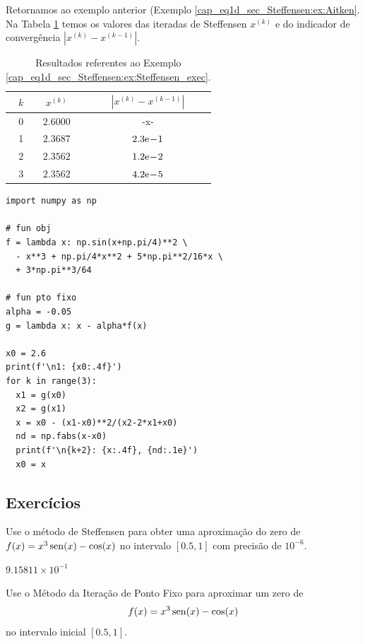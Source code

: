 \begin{ex}\label{cap_eq1d_sec_Steffensen:ex:Steffensen_exec}
  Retornamos ao exemplo anterior (Exemplo \ref{cap_eq1d_sec_Steffensen:ex:Aitken}. Na Tabela \ref{cap_eq1d_sec_Steffensen:tab:ex_Steffensen_exec} temos os valores das iteradas de Steffensen $x^{(k)}$ e do indicador de convergência $|x^{(k)}-x^{(k-1)}|$.

\begin{table}[h!]
  \centering
  \caption{Resultados referentes ao Exemplo \ref{cap_eq1d_sec_Steffensen:ex:Steffensen_exec}.}
  \label{cap_eq1d_sec_Steffensen:tab:ex_Steffensen_exec}
  \begin{tabular}{r|cc}
    $k$ & $x^{(k)}$ & $|x^{(k)}-x^{(k-1)}|$ \\\hline
    0 & $2.6000$ & -x- \\
    1 & $2.3687$ & $2.3\mathrm{e}\!-\!1$ \\
    2 & $2.3562$ & $1.2\mathrm{e}\!-\!2$ \\
    3 & $2.3562$ & $4.2\mathrm{e}\!-\!5$ \\\hline
  \end{tabular}
\end{table}

\begin{lstlisting}
import numpy as np

# fun obj
f = lambda x: np.sin(x+np.pi/4)**2 \
  - x**3 + np.pi/4*x**2 + 5*np.pi**2/16*x \
  + 3*np.pi**3/64

# fun pto fixo
alpha = -0.05
g = lambda x: x - alpha*f(x)

x0 = 2.6
print(f'\n1: {x0:.4f}')
for k in range(3):
  x1 = g(x0)
  x2 = g(x1)
  x = x0 - (x1-x0)**2/(x2-2*x1+x0)
  nd = np.fabs(x-x0)
  print(f'\n{k+2}: {x:.4f}, {nd:.1e}')
  x0 = x
\end{lstlisting}

\end{ex}

\subsection*{Exercícios}

\begin{exer}
  Use o método de Steffensen para obter uma aproximação do zero de $f(x)=x^3\operatorname{sen}(x)-\cos(x)$ no intervalo $[0.5, 1]$ com precisão de $10^{-6}$.
\end{exer}
\begin{resp}
    $9.15811\times 10^{-1}$
\end{resp}

\begin{exer}
  Use o Método da Iteração de Ponto Fixo para aproximar um zero de
  \begin{equation}
    f(x)=x^3\operatorname{sen}(x)-\cos(x)
  \end{equation}
  no intervalo inicial $[0.5, 1]$.
\end{exer}

